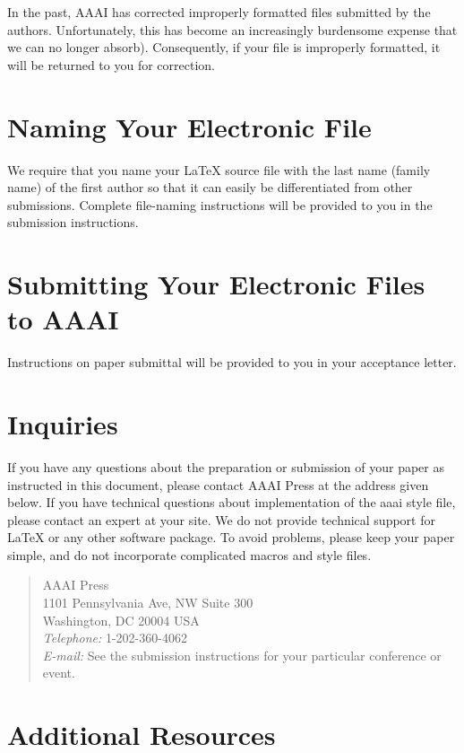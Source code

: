 In the past, AAAI has corrected improperly formatted files submitted by
the authors. Unfortunately, this has become an increasingly burdensome
expense that we can no longer absorb). Consequently, if your file is
improperly formatted, it will be returned to you for correction.

\section{Naming Your Electronic File}

We require that you name your \LaTeX{} source file with the last name
(family name) of the first author so that it can easily be
differentiated from other submissions. Complete file-naming instructions
will be provided to you in the submission instructions.

\section{Submitting Your Electronic Files to AAAI}

Instructions on paper submittal will be provided to you in your
acceptance letter.

\section{Inquiries}

If you have any questions about the preparation or submission of your
paper as instructed in this document, please contact AAAI Press at the
address given below. If you have technical questions about
implementation of the aaai style file, please contact an expert at your
site. We do not provide technical support for \LaTeX{} or any other
software package. To avoid problems, please keep your paper simple, and
do not incorporate complicated macros and style files.

\begin{quote}
\noindent AAAI Press\\
1101 Pennsylvania Ave, NW Suite 300\\
Washington, DC 20004 USA\\
\textit{Telephone:} 1-202-360-4062\\
\textit{E-mail:} See the submission instructions for your particular conference or event.
\end{quote}

\section{Additional Resources}

